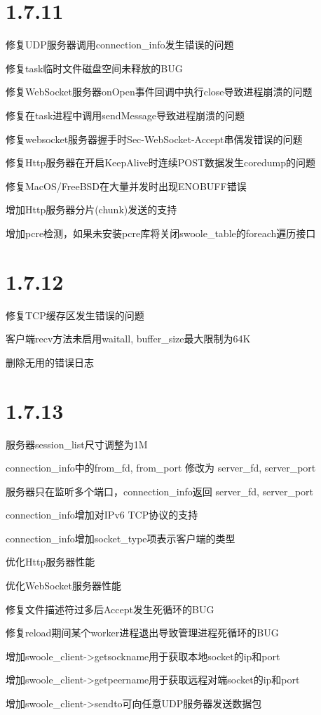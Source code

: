 \section{1.7.11}

\begin{compactitem}
\item 修复UDP服务器调用connection\_info发生错误的问题
\item 修复task临时文件磁盘空间未释放的BUG
\item 修复WebSocket服务器onOpen事件回调中执行close导致进程崩溃的问题
\item 修复在task进程中调用sendMessage导致进程崩溃的问题
\item 修复websocket服务器握手时Sec-WebSocket-Accept串偶发错误的问题
\item 修复Http服务器在开启KeepAlive时连续POST数据发生coredump的问题
\item 修复MacOS/FreeBSD在大量并发时出现ENOBUFF错误
\item 增加Http服务器分片(chunk)发送的支持
\item 增加pcre检测，如果未安装pcre库将关闭swoole\_table的foreach遍历接口
\end{compactitem}

\section{1.7.12}


\begin{compactitem}
\item 修复TCP缓存区发生错误的问题
\item 客户端recv方法未启用waitall, buffer\_size最大限制为64K
\item 删除无用的错误日志
\end{compactitem}


\section{1.7.13}


\begin{compactitem}
\item 服务器session\_list尺寸调整为1M
\item connection\_info中的from\_fd, from\_port 修改为 server\_fd, server\_port
\item 服务器只在监听多个端口，connection\_info返回 server\_fd, server\_port
\item connection\_info增加对IPv6 TCP协议的支持
\item connection\_info增加socket\_type项表示客户端的类型
\item 优化Http服务器性能
\item 优化WebSocket服务器性能
\item 修复文件描述符过多后Accept发生死循环的BUG
\item 修复reload期间某个worker进程退出导致管理进程死循环的BUG
\item 增加swoole\_client->getsockname用于获取本地socket的ip和port
\item 增加swoole\_client->getpeername用于获取远程对端socket的ip和port
\item 增加swoole\_client->sendto可向任意UDP服务器发送数据包
\end{compactitem}


